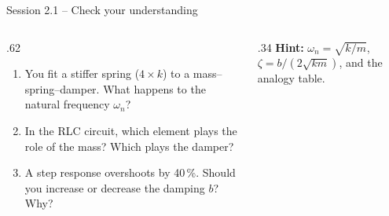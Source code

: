 \documentclass[aspectratio=169,10pt]{beamer}
\begin{document}
\begin{frame}{Session 2.1 -- Check your understanding}
\begin{columns}[T]
\begin{column}{.62\textwidth}
\begin{keybox}
\begin{enumerate}\setlength\itemsep{6pt}
\item You fit a stiffer spring ($4\times k$) to a mass--spring--damper. What happens to the natural frequency $\omega_n$?
\item In the RLC circuit, which element plays the role of the mass? Which plays the damper?
\item A step response overshoots by 40\,\%. Should you increase or decrease the damping $b$? Why?
\end{enumerate}
\end{keybox}
\end{column}
\begin{column}{.34\textwidth}
\small
\textbf{Hint:} $\omega_n=\sqrt{k/m}$, $\zeta=b/(2\sqrt{km})$, and the analogy table.
\end{column}
\end{columns}
\end{frame}
\end{document}
